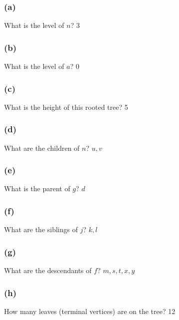 \documentclass[14pt]{extarticle}
\begin{document}
\subsubsection{(a)}
What is the level of \(n\)? \hspace{2cm}{\it Proof.} 3

\subsubsection{(b)}
What is the level of \(a\)? \hspace{2cm}{\it Proof.} 0

\subsubsection{(c)}
What is the height of this rooted tree? \hspace{2cm}{\it Proof.} 5

\subsubsection{(d)}
What are the children of \(n\)?
\hspace{2cm}{\it Proof.} \(u, v\)

\subsubsection{(e)}
What is the parent of \(g\)? \hspace{2cm}{\it Proof.}\(d\)


\subsubsection{(f)}
What are the siblings of \(j\)?
\hspace{2cm}{\it Proof.} \(k, l\)

\subsubsection{(g)}
What are the descendants of \(f\)?
\hspace{2cm}{\it Proof.} \(m, s, t, x, y\)


\subsubsection{(h)}
How many leaves (terminal vertices) are on the tree?
\hspace{2cm}{\it Proof.} 12
\end{document}
